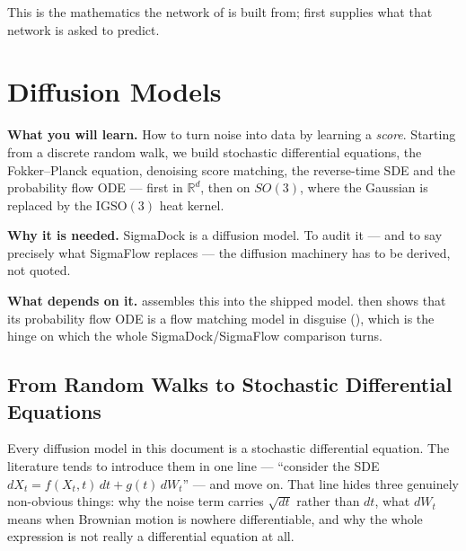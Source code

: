 \documentclass[11pt,a4paper]{report}
\theoremstyle{definition}
\theoremstyle{remark}
\newcommand{\RR}{\mathbb R}
\begin{document}
This is the mathematics the network of  is built from;  first supplies what that network is asked to predict.

\clearpage

\part{Diffusion Models}
\label{part:diffusion-models}
\label{part:diffusion}


\begin{tcolorbox}[colback=gray!4,colframe=gray!55!black,
  title=Part III at a glance, fonttitle=\bfseries, breakable]
\textbf{What you will learn.} How to turn noise into data by learning a \emph{score}. Starting from a discrete random walk, we build stochastic differential equations, the Fokker--Planck equation, denoising score matching, the reverse-time SDE and the probability flow ODE --- first in $\RR^d$, then on $SO(3)$, where the Gaussian is replaced by the $\mathrm{IGSO}(3)$ heat kernel.

\textbf{Why it is needed.} SigmaDock is a diffusion model. To audit it --- and to say precisely what SigmaFlow replaces --- the diffusion machinery has to be derived, not quoted.

\textbf{What depends on it.}  assembles this into the shipped model.  then shows that its probability flow ODE is a flow matching model in disguise (), which is the hinge on which the whole SigmaDock/SigmaFlow comparison turns.
\end{tcolorbox}


\chapter{From Random Walks to Stochastic Differential Equations}
\label{chap:sde-toolbox}

Every diffusion model in this document is a stochastic differential equation.
The literature tends to introduce them in one line --- ``consider the SDE
$dX_t = f(X_t,t)\,dt + g(t)\,dW_t$'' --- and move on. That line hides three
genuinely non-obvious things: why the noise term carries $\sqrt{dt}$ rather
than $dt$, what $dW_t$ means when Brownian motion is nowhere
differentiable, and why the whole expression is not really a differential
equation at all.
\end{document}

